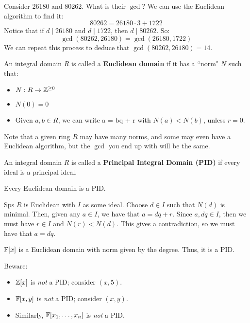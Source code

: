 
Consider 26180 and 80262. What is their $ \gcd $?
We can use the Euclidean algorithm to find it:
\begin{equation*}
    80262 = 26180 \cdot 3 + 1722
\end{equation*}
Notice that if $ d \mid 26180 $ and $ d \mid 1722 $, then $ d \mid 80262 $. So:
\begin{equation*}
    \gcd(80262, 26180) = \gcd(26180, 1722)
\end{equation*}
We can repeat this process to deduce that $ \gcd(80262, 26180) = 14 $.

\begin{defn}
    An integral domain $ R $ is called a \textbf{Euclidean domain} if it has a ``norm" $ N $
    such that:
    \begin{itemize}
        \item $ N:R\rightarrow\mathbb{Z}^{\geq0} $
        \item $ N(0) = 0 $
        \item Given $ a, b \in R $, we can write a = bq + r with $ N(a) < N(b) $, unless $ r=0 $.
    \end{itemize}
\end{defn}
Note that a given ring $ R $ may have many norms, and some may even have a Euclidean algorithm,
but the $ \gcd $ you end up with will be the same.

\begin{defn}
    An integral domain $ R $ is called a \textbf{Principal Integral Domain (PID)} if every
    ideal is a principal ideal.
\end{defn}

\begin{thm}
    Every Euclidean domain is a PID.
\end{thm}

\begin{pf}[source=Primary Source Material]
    Sps $ R $ is Euclidean with $ I $ as some ideal.
    Choose $ d \in I $ such that $ N(d) $ is minimal. \vsp
    Then, given any $ a \in I $, we have that $ a = dq + r $. Since $ a, dq \in I $, then
    we must have $ r \in I $ and $ N(r) < N(d) $. This gives a contradiction, so we must have
    that $ a = dq $.
\end{pf}

\begin{xmp}[source=Primary Source Material]
    $ \mathbb{F}[x] $ is a Euclidean domain with norm given by the degree. Thus, it is a PID.
\end{xmp}
Beware:
\begin{itemize}
    \item $ \mathbb{Z}[x] $ is \textit{not} a PID; consider $ (x, 5) $.
    \item $ \mathbb{F}[x, y] $ is \textit{not} a PID; consider $ (x, y) $.
    \item Similarly, $ \mathbb{F}[x_{1}, \dots, x_{n}] $ is \textit{not} a PID.
\end{itemize}

